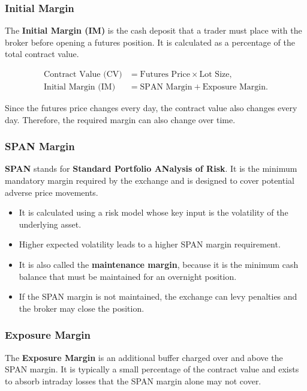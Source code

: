 \documentclass[12pt,openany]{book}
\begin{document}
\subsubsection{Initial Margin}
The \textbf{Initial Margin (IM)} is the cash deposit that a trader must place with the broker before opening a futures position. It is calculated as a percentage of the total contract value.

\begin{align*}
\text{Contract Value (CV)} &= \text{Futures Price} \times \text{Lot Size}, \\
\text{Initial Margin (IM)} &= \text{SPAN Margin} + \text{Exposure Margin}.
\end{align*}

Since the futures price changes every day, the contract value also changes every day. Therefore, the required margin can also change over time.

\subsubsection{SPAN Margin}
\textbf{SPAN} stands for \textbf{Standard Portfolio ANalysis of Risk}. It is the minimum mandatory margin required by the exchange and is designed to cover potential adverse price movements.

\begin{itemize}[leftmargin=*]
    \item It is calculated using a risk model whose key input is the volatility of the underlying asset.
    \item Higher expected volatility leads to a higher SPAN margin requirement.
    \item It is also called the \textbf{maintenance margin}, because it is the minimum cash balance that must be maintained for an overnight position.
    \item If the SPAN margin is not maintained, the exchange can levy penalties and the broker may close the position.
\end{itemize}

\subsubsection{Exposure Margin}
The \textbf{Exposure Margin} is an additional buffer charged over and above the SPAN margin. It is typically a small percentage of the contract value and exists to absorb intraday losses that the SPAN margin alone may not cover.
\end{document}
